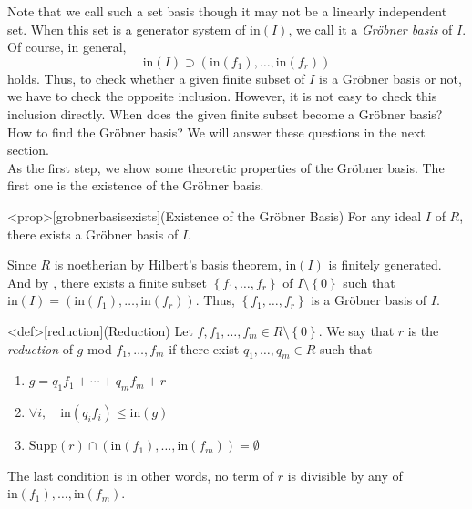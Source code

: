 \documentclass{article}
\begin{document}
Note that we call such a set basis though it may not be a linearly independent set. When this set is a generator system of $\mathrm{in}(I)$, we call it a \textit{Gr\"{o}bner basis} of $I$.\\ 
Of course, in general, $$\mathrm{in}(I) \supset \left( \mathrm{in}(f_1), \ldots, \mathrm{in}(f_r) \right)$$ holds. Thus, to check whether a given finite subset of $I$ is a Gr\"{o}bner basis or not, we have to check the opposite inclusion. However, it is not easy to check this inclusion directly. When does the given finite subset become a Gr\"{o}bner basis? How to find the Gr\"{o}bner basis? We will answer these questions in the next section.\\ 
As the first step, we show some theoretic properties of the Gr\"{o}bner basis. The first one is the existence of the Gr\"{o}bner basis.

\begin{statementsp}<prop>[grobnerbasisexists](Existence of the Gr\"{o}bner Basis)
    For any ideal $I$ of $R$, there exists a Gr\"{o}bner basis of $I$.
\end{statementsp}
\begin{pfsp}
    Since $R$ is noetherian by Hilbert's basis theorem, $\mathrm{in}(I)$ is finitely generated. And by , there exists a finite subset $\left\{ f_1, \ldots, f_r \right\}$ of $I \setminus \left\{ 0 \right\}$ such that $\mathrm{in}(I) = \left( \mathrm{in}(f_1), \ldots, \mathrm{in}(f_r) \right)$. Thus, $\left\{ f_1, \ldots, f_r \right\}$ is a Gr\"{o}bner basis of $I$.
\end{pfsp}

\begin{statementsp}<def>[reduction](Reduction)
    Let $f, f_1, \ldots, f_m \in R \setminus \left\{ 0 \right\}$. We say that $r$ is the \textit{reduction} of $g$ mod $f_1, \ldots, f_m$ if there exist $q_1, \ldots, q_m \in R$ such that
    \begin{enumerate}
        \item $g = q_1 f_1 + \cdots + q_m f_m + r$
        \item $\forall i, \quad \mathrm{in}(q_i f_i) \leq \mathrm{in}(g)$
        \item $\mathrm{Supp}(r) \cap (\mathrm{in}(f_1), \ldots, \mathrm{in}(f_m)) = \emptyset$
    \end{enumerate}
    The last condition is in other words, no term of $r$ is divisible by any of $\mathrm{in}(f_1), \ldots, \mathrm{in}(f_m)$.
\end{statementsp}
\end{document}
